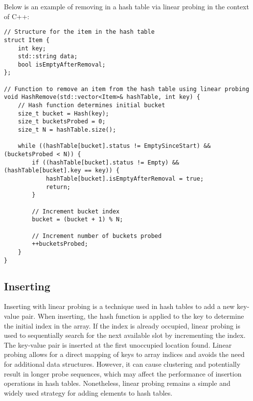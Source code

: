 \begin{solution}

Below is an example of removing in a hash table via linear probing in the context of C++:

\horizontalline

\begin{verbatim}
// Structure for the item in the hash table
struct Item {
    int key;
    std::string data;
    bool isEmptyAfterRemoval;
};

// Function to remove an item from the hash table using linear probing
void HashRemove(std::vector<Item>& hashTable, int key) {
    // Hash function determines initial bucket
    size_t bucket = Hash(key);
    size_t bucketsProbed = 0;
    size_t N = hashTable.size();

    while ((hashTable[bucket].status != EmptySinceStart) && (bucketsProbed < N)) {
        if ((hashTable[bucket].status != Empty) && (hashTable[bucket].key == key)) {
            hashTable[bucket].isEmptyAfterRemoval = true;
            return;
        }

        // Increment bucket index
        bucket = (bucket + 1) % N;

        // Increment number of buckets probed
        ++bucketsProbed;
    }
}
\end{verbatim}

\horizontalline

\end{solution}

\subsection*{Inserting}

Inserting with linear probing is a technique used in hash tables to add a new key-value pair. When inserting, the hash function is applied to the key to determine the initial index in the array. If the index is already occupied, linear 
probing is used to sequentially search for the next available slot by incrementing the index. The key-value pair is inserted at the first unoccupied location found. Linear probing allows for a direct mapping of keys to array indices and 
avoids the need for additional data structures. However, it can cause clustering and potentially result in longer probe sequences, which may affect the performance of insertion operations in hash tables. Nonetheless, linear probing remains 
a simple and widely used strategy for adding elements to hash tables.


